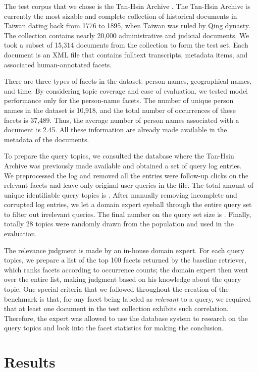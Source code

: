 The test corpus that we chose is the Tan-Hsin Archive .  The
Tan-Hsin Archive is currently the most sizable and complete collection of
historical documents in Taiwan dating back from 1776 to 1895, when Taiwan was
ruled by Qing dynasty.  The collection contains nearly 20,000 administrative
and judicial documents.  We took a subset of 15,314 documents from the
collection to form the test set.  Each document is an XML file that contains
fulltext transcripts, metadata items, and associated human-annotated facets.  

There are three types of facets in the dataset: person names, geographical
names, and time.  By considering topic coverage and ease of evaluation, we
tested model performance only for the person-name facets.  The number of unique
person names in the dataset is 10,918, and the total number of occurrences of
these facets is 37,489.  Thus, the average number of person names associated
with a document is 2.45.  All these information are already made available in
the metadata of the documents.  

To prepare the query topics, we consulted the database where the Tan-Hsin
Archive was previously made available and obtained a set of query log entries.
We preprocessed the log and removed all the entries were follow-up clicks on
the relevant facets and leave only original user queries in the file.  The
total amount of unique identifiable query topics is .  After
manually removing incomplete and corrupted log entries, we let a domain expert
eyeball through the entire query set to filter out irrelevant queries.   The
final number on the query set size is .  Finally, totally 28
topics were randomly drawn from the population and used in the evaluation.

The relevance judgment is made by an in-house domain expert.  For each query
topics, we prepare a list of the top 100 facets returned by the baseline
retriever, which ranks facets according to occurrence counts; the domain expert
then went over the entire list, making judgment based on his knowledge about
the query topic.  One special criteria that we followed throughout the creation
of the benchmark is that, for any facet being labeled as \emph{relevant} to a
query, we required that at least one document in the test collection exhibits
such correlation.  Therefore, the expert was allowed to use the database system
to research on the query topics and look into the facet statistics for making
the conclusion.

\section{Results}\label{s:results}

